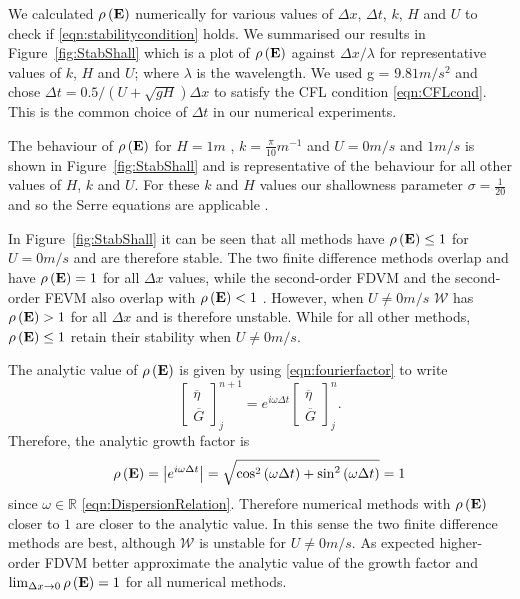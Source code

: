 We calculated $\rho\left(\mathbf{E} \right)$ numerically for various values of $\Delta x$, $\Delta t$, $k$, $H$ and $U$ to check if \eqref{eqn:stabilitycondition} holds. We summarised our results in Figure~\ref{fig:StabShall} which is a plot of $\rho\left(\mathbf{E}\right)$ against $\Delta x / \lambda$ for representative values of $k$, $H$ and $U$; where $\lambda$ is the wavelength. We used g = $9.81m/s^2$ and chose $\Delta t = 0.5 / \left(U + \sqrt{gH}\right) \Delta x$ to satisfy the CFL condition \eqref{eqn:CFLcond}. This is the common choice of $\Delta t$ in our numerical experiments.

The behaviour of $\rho\left(\mathbf{E}\right)$ for $H=1 m$ , $k = \frac{\pi}{10} m^{-1}$ and $U = 0 m/s$ and $1 m/s$ is shown in Figure~\ref{fig:StabShall} and is representative of the behaviour for all other values of $H$, $k$ and $U$. For these $k$ and $H$ values our shallowness parameter $\sigma = \frac{1}{20}$ and so the Serre equations are applicable \cite{Barthelemy-2004-315}. 

In Figure~\ref{fig:StabShall} it can be seen that all methods have $\rho\left(\mathbf{E} \right) \le 1$ for $U=0m/s$ and are therefore stable. The two finite difference methods overlap and have $\rho\left(\mathbf{E} \right) = 1$ for all $\Delta x$ values, while the second-order FDVM and the second-order FEVM also overlap with $\rho\left(\mathbf{E} \right) < 1$ . However, when $U \neq 0m/s$ $\mathcal{W}$ has $\rho\left(\mathbf{E} \right) > 1$ for all $\Delta x$ and is therefore unstable. While for all other methods, $\rho\left(\mathbf{E} \right) \le 1$ retain their stability when $U \neq 0m/s$.

The analytic value of $\rho\left(\mathbf{E}\right)$ is given by using \eqref{eqn:fourierfactor} to write
\begin{equation*}
\begin{bmatrix}
\overline{\eta} \\ \overline{G}
\end{bmatrix}^{n+1}_j = e^{i \omega \Delta t}\begin{bmatrix}
\overline{\eta} \\ \overline{G}
\end{bmatrix}^{n}_j.
\end{equation*}
Therefore, the analytic growth factor is
\begin{align}
\rho\left(\mathbf{E}\right) = \left| e^{i \omega \Delta t} \right| = \sqrt{\cos^2 \left(\omega \Delta t\right) + \sin^2 \left(\omega \Delta t\right)}  = 1
\end{align}
since $\omega \in \mathbb{R}$ \eqref{eqn:DispersionRelation}. Therefore numerical methods with $\rho\left(\mathbf{E}\right)$ closer to $1$ are closer to the analytic value. In this sense the two finite difference methods are best, although $\mathcal{W}$ is unstable for $U \neq 0m/s$. As expected higher-order FDVM better approximate the analytic value of the growth factor and $\lim_{\Delta x \rightarrow 0}\rho\left(\mathbf{E}\right) = 1$ for all numerical methods.

